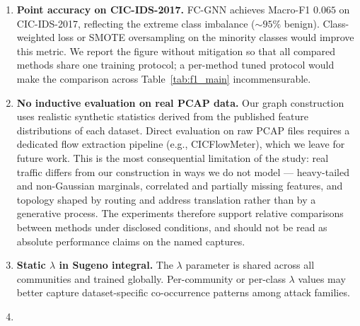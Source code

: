 \begin{enumerate}
\item \textbf{Point accuracy on CIC-IDS-2017.}
      FC-GNN achieves Macro-F1 $0.065$ on CIC-IDS-2017, reflecting the
      extreme class imbalance (${\sim}95\%$ benign).
      Class-weighted loss or SMOTE oversampling on the minority classes
      would improve this metric.
      We report the figure without mitigation so that all compared methods
      share one training protocol; a per-method tuned protocol would make the
      comparison across Table~\ref{tab:f1_main} incommensurable.
\item \textbf{No inductive evaluation on real PCAP data.}
      Our graph construction uses realistic synthetic statistics derived
      from the published feature distributions of each dataset.
      Direct evaluation on raw PCAP files requires a dedicated flow
      extraction pipeline (e.g., CICFlowMeter), which we leave for future
      work.
      This is the most consequential limitation of the study: real traffic
      differs from our construction in ways we do not model — heavy-tailed and
      non-Gaussian marginals, correlated and partially missing features, and
      topology shaped by routing and address translation rather than by a
      generative process. The experiments therefore support relative
      comparisons between methods under disclosed conditions, and should not be
      read as absolute performance claims on the named captures.
\item \textbf{Static $\lambda$ in Sugeno integral.}
      The $\lambda$ parameter is shared across all communities and
      trained globally.
      Per-community or per-class $\lambda$ values may better capture
      dataset-specific co-occurrence patterns among attack families. 
\item {}

\end{enumerate}
